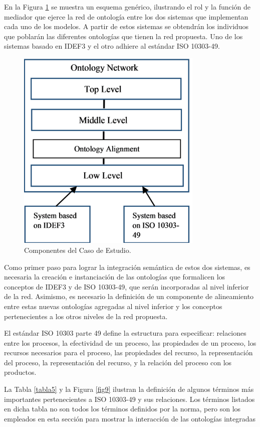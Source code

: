 \documentclass[journal]{IEEEtran}
\begin{document}
En la Figura \ref{fig8} se muestra un esquema gen\'erico, ilustrando el rol y la funci\'on de mediador que ejerce la red de ontolog\'ia entre los dos sistemas que implementan cada uno de los modelos. A partir de estos sistemas se obtendr\'an los individuos que poblar\'an las diferentes ontolog\'ias que tienen la red propuesta. Uno de los sistemas basado en IDEF3 y el otro adhiere al est\'andar ISO 10303-49.

\begin{figure}[!t]
\centering
\includegraphics[width=3.5in]{figures/figure8.png}
\caption{Componentes del Caso de Estudio.}
\label{fig8}
\end{figure}

Como primer paso para lograr la integraci\'on sem\'antica de estos dos sistemas, es necesaria la creaci\'on e instanciaci\'on de las ontolog\'ias que formalicen los conceptos de IDEF3 y de ISO 10303-49, que ser\'an incorporadas al nivel inferior de la red. Asimismo, es necesario la definici\'on de un componente de alineamiento entre estas nuevas ontolog\'ias agregadas al nivel inferior y los conceptos pertenecientes a los otros niveles de la red propuesta. 

El est\'andar ISO 10303 parte 49 define la estructura para especificar: relaciones entre los procesos, la efectividad de un proceso, las propiedades de un proceso, los recursos necesarios para el proceso, las propiedades del recurso, la representaci\'on del proceso, la representaci\'on del recurso, y la relaci\'on del proceso con los productos. 

La Tabla \ref{tabla5} y la Figura \ref{fig9} ilustran la definici\'on de algunos t\'erminos m\'as importantes pertenecientes a ISO 10303-49 y sus relaciones. Los t\'erminos listados en dicha tabla no son todos los t\'erminos definidos por la norma, pero son los empleados en esta secci\'on para mostrar la interacci\'on de las ontolog\'ias integradas
\end{document}
